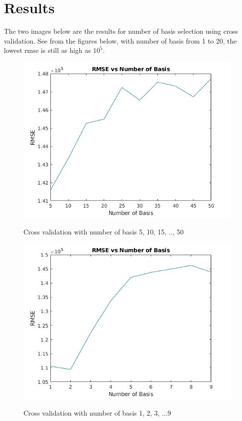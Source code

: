 \documentclass[11pt]{article} %
\begin{document}
\section{Results}
The two images below are the results for number of basis selection using cross validation. See from the figures below, with number of basis from 1 to 20, the lowest rmse is still as high as $10^{5}$.\\
\begin{figure}[H] 
  \begin{minipage}[H]{0.5\linewidth}\label{ m1cv1} 
    \includegraphics[width=1\linewidth]{m1CV1.jpg} 
    \caption{Cross validation with number of basis 5, 10, 15, .., 50} 
  \end{minipage} 
  \begin{minipage}[H]{0.5\linewidth}\label{ m1cv2} 
    \includegraphics[width=1\linewidth]{m1CV2.jpg} 
    \caption{Cross validation with number of basis 1, 2, 3, ...9} 
  \end{minipage} 
  \hfill
\end{figure}\mbox{}\\
\end{document}

